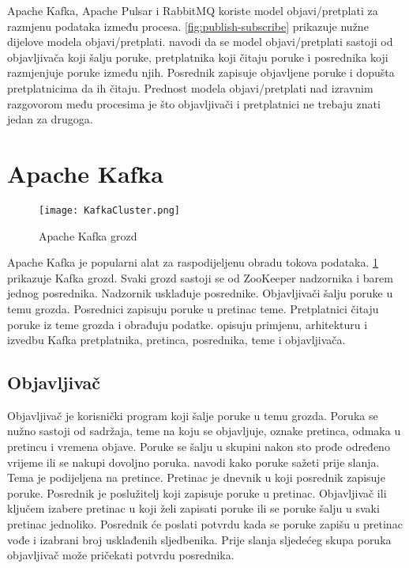 \documentclass[times, utf8, diplomski, numeric]{fer}
\begin{document}
Apache Kafka, Apache Pulsar i RabbitMQ koriste model objavi/pretplati za razmjenu podataka između procesa. \ref{fig:publish-subscribe} prikazuje nužne dijelove modela objavi/pretplati. \citep{rassus-manual} navodi da se model objavi/pretplati sastoji od objavljivača koji šalju poruke, pretplatnika koji čitaju poruke i posrednika koji razmjenjuje poruke između njih. Posrednik zapisuje objavljene poruke i dopušta pretplatnicima da ih čitaju. Prednost modela objavi/pretplati nad izravnim razgovorom među procesima je što objavljivači i pretplatnici ne trebaju znati jedan za drugoga.

\section{Apache Kafka}

\begin{figure}[H]
    \centering
    \texttt{[image: KafkaCluster.png]}
    \caption{Apache Kafka grozd}
    \label{fig:kafka-cluster}
\end{figure}

Apache Kafka je popularni alat za raspodijeljenu obradu tokova podataka. \ref{fig:kafka-cluster} prikazuje Kafka grozd. Svaki grozd sastoji se od ZooKeeper nadzornika i barem jednog posrednika. Nadzornik usklađuje posrednike. Objavljivači šalju poruke u temu grozda. Posrednici zapisuju poruke u pretinac teme. Pretplatnici čitaju poruke iz teme grozda i obrađuju podatke. \citep{kafka-whitepaper} \citep{kafka-docs} opisuju primjenu, arhitekturu i izvedbu Kafka pretplatnika, pretinca, posrednika, teme i objavljivača.

\subsection{Objavljivač}
Objavljivač je korisnički program koji šalje poruke u temu grozda. Poruka se nužno sastoji od sadržaja, teme na koju se objavljuje, oznake pretinca, odmaka u pretincu i vremena objave. Poruke se šalju u skupini nakon sto prođe određeno vrijeme ili se nakupi dovoljno poruka. \cite{kafka-compression} navodi kako poruke sažeti prije slanja. Tema je podijeljena na pretince. Pretinac je dnevnik u koji posrednik zapisuje poruke. Posrednik je poslužitelj koji zapisuje poruke u pretinac. Objavljivač ili ključem izabere pretinac u koji želi zapisati poruke ili se poruke šalju u svaki pretinac jednoliko. Posrednik će poslati potvrdu kada se poruke zapišu u pretinac vođe i izabrani broj usklađenih sljedbenika. Prije slanja sljedećeg skupa poruka objavljivač može pričekati potvrdu posrednika.
\end{document}
